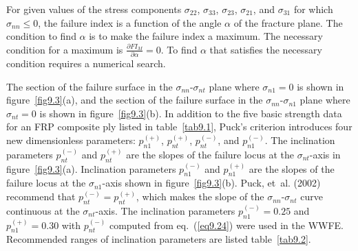 \documentclass{AeroStructure-ERJohnson}
\begin{document}
\removelastskip

For given values of the stress components $\sigma_{22}$, $\sigma_{33}$, $\sigma_{23}$, $\sigma_{21}$, and $\sigma_{31}$ for which $\sigma_{n n} \leq 0$, the failure index is a function of the angle $\alpha$ of the fracture plane. The condition to find $\alpha$ is to make the failure index a maximum. The necessary condition for a maximum is $\frac{\partial F I_{M}}{\partial \alpha}=0$. To find $\alpha$ that satisfies the necessary condition requires a numerical search.

The section of the failure surface in the $\sigma_\textit{nn}$-$\sigma_\textit{nt}$ plane where $\sigma_{n1} = 0$ is shown in figure~\ref{fig9.3}(a), and the section of the failure surface in the $\sigma_\textit{nn}$-$\sigma_{n1}$ plane where $\sigma_\textit{nt} = 0$ is shown in figure~\ref{fig9.3}(b). In addition to the five basic strength data for an FRP composite ply listed in table~\ref{tab9.1}, Puck's criterion introduces four new dimensionless parameters: $p_{n1}^{(+)}$, $p_{n t}^{(+)}$, $p_{n t}^{(-)}$, and $p_{n 1}^{(-)}$. The inclination parameters $p_{n t}^{(-)}$ and $p_{n t}^{(+)}$ are the slopes of the failure locus at the $\sigma_{nt}$-axis in figure~\ref{fig9.3}(a). Inclination parameters $p_{n1}^{(-)}$ and $p_{n 1}^{(+)}$ are the slopes of the failure locus at the $\sigma_{n1}$-axis shown in figure~\ref{fig9.3}(b). Puck, et~al. (2002) recommend that $p_{n t}^{(-)}=p_{n t}^{(+)}$, which makes the slope of the $\sigma_\textit{nn}$-$\sigma_\textit{nt}$ curve continuous at the $\sigma_\textit{nt}$-axis. The inclination parameters $p_{n 1}^{(-)}=0.25$ and $p_{n 1}^{(+)}=0.30$ with $p_{n t}^{(-)}$ computed from eq.~(\ref{eq9.24}) were used in the WWFE. Recommended ranges of inclination parameters are listed table~\ref{tab9.2}.


\begin{table}[!h]
\vspace*{-1pc}
\end{table}
\end{document}
